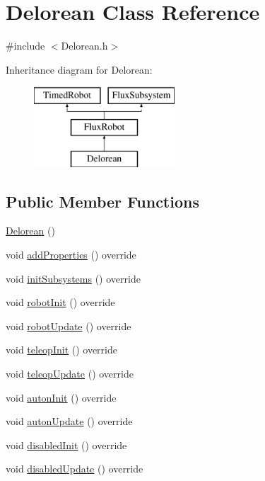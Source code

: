 \hypertarget{classDelorean}{}\section{Delorean Class Reference}
\label{classDelorean}


{\ttfamily \#include $<$Delorean.\+h$>$}

Inheritance diagram for Delorean\+:\begin{figure}[H]
\begin{center}
\leavevmode
\includegraphics[height=3.000000cm]{classDelorean}
\end{center}
\end{figure}
\subsection*{Public Member Functions}
\begin{DoxyCompactItemize}
\item 
\hyperlink{classDelorean_a80afc6fe9ba8edac0af62189b8afbbd3}{Delorean} ()
\item 
void \hyperlink{classDelorean_a2baeb249408fd1d61da69b1edd832554}{add\+Properties} () override
\item 
void \hyperlink{classDelorean_a8ccfc53654ee0512a7e6ba1d6ba739c0}{init\+Subsystems} () override
\item 
void \hyperlink{classDelorean_a591e1b68a21a82c7e1cf4e7dbf5294a2}{robot\+Init} () override
\item 
void \hyperlink{classDelorean_a47b9cfdb59a6f46ee26f45f794e313c1}{robot\+Update} () override
\item 
void \hyperlink{classDelorean_a789c6e4e70f4e2cfdf944d1a1a149509}{teleop\+Init} () override
\item 
void \hyperlink{classDelorean_a6053dfc106d71fcffa30bac0f5e9b5b8}{teleop\+Update} () override
\item 
void \hyperlink{classDelorean_ad06990e5c59d5f4d30b48015e744cc49}{auton\+Init} () override
\item 
void \hyperlink{classDelorean_a17c9b875c9c0d3c9b9dadd5838bfedfd}{auton\+Update} () override
\item 
void \hyperlink{classDelorean_ae054ba79b38b46d20e50becb5d31884c}{disabled\+Init} () override
\item 
void \hyperlink{classDelorean_acc8f7d93dd894233d16f34316d363983}{disabled\+Update} () override
\end{DoxyCompactItemize}
